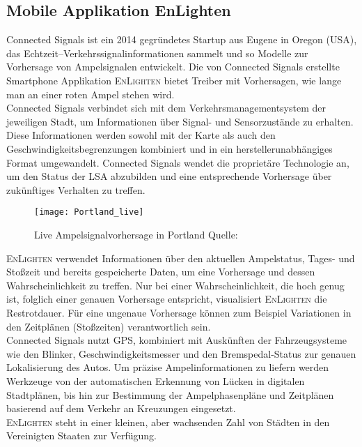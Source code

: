 \subsection*{Mobile Applikation EnLighten}
Connected Signals ist ein 2014 gegründetes Startup aus Eugene in Oregon (USA), das Echtzeit--Verkehrssignalinformationen sammelt und so Modelle zur Vorhersage von Ampelsignalen entwickelt. Die von Connected Signals erstellte Smartphone Applikation \textsc{EnLighten} bietet Treiber mit Vorhersagen, wie lange man an einer roten Ampel stehen wird. \cite{connectedSignals} \\
Connected Signals verbindet sich mit dem Verkehrsmanagementsystem der jeweiligen Stadt, um Informationen über Signal- und Sensorzustände zu erhalten. Diese Informationen werden sowohl mit der Karte als auch den Geschwindigkeitsbegrenzungen kombiniert und in ein herstellerunabhängiges Format umgewandelt. Connected Signals wendet die proprietäre Technologie an, um den Status der \gls{LSA} abzubilden und eine entsprechende Vorhersage über zukünftiges Verhalten zu treffen. \cite{signals} 
\begin{figure}[t]
    \centering
    \texttt{[image: Portland\_live]} 
    \grayRule
    \label{fig:enlighten}
    \caption[Connected Signals live Vorhersage]{Live Ampelsignalvorhersage in Portland Quelle: \cite{signals}}
\end{figure}
\textsc{EnLighten} verwendet Informationen über den aktuellen Ampelstatus, Tages- und Stoßzeit und bereits gespeicherte Daten, um eine Vorhersage und dessen Wahrscheinlichkeit zu treffen. Nur bei einer Wahrscheinlichkeit, die hoch genug ist, folglich einer genauen Vorhersage entspricht, visualisiert \textsc{EnLighten} die Restrotdauer. Für eine ungenaue Vorhersage können zum Beispiel Variationen in den Zeitplänen (Stoßzeiten) verantwortlich sein.\\  
Connected Signals nutzt \gls{GPS}, kombiniert mit Auskünften der Fahrzeugsysteme wie den Blinker, Geschwindigkeitsmesser und den Bremspedal-Status zur genauen Lokalisierung des Autos. Um präzise Ampelinformationen zu liefern werden Werkzeuge von der automatischen Erkennung von Lücken in digitalen Stadtplänen, bis hin zur Bestimmung der Ampelphasenpläne und Zeitplänen basierend auf dem Verkehr an Kreuzungen eingesetzt. \cite{EnLighten} \\
\textsc{EnLighten} steht in einer kleinen, aber wachsenden Zahl von Städten in den Vereinigten Staaten zur Verfügung. 
